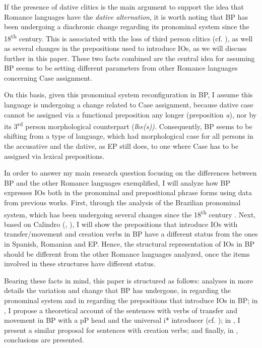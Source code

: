 \documentclass[output=paper,colorlinks,citecolor=brown,nonflat]{./langscibook}
\begin{document}
If the presence of dative clitics is the main argument to support the idea that Romance languages have the \textit{dative alternation}, it is worth noting that BP has been undergoing a diachronic change regarding its pronominal system since the 18\textsuperscript{th} century. This is associated with the loss of third person clitics (cf. \citealt{CarvalhoCalindro2018}), as well as several changes in the prepositions used to introduce IOs, as we will discuss further in this paper. These two facts combined are the central idea for assuming BP seems to be setting different parameters from other Romance languages concerning Case assignment.

On this basis, given this pronominal system reconfiguration in BP, I assume this language is undergoing a change related to Case assignment, because dative case cannot be assigned via a functional preposition any longer (preposition \textit{a}), nor by its 3\textsuperscript{rd} person morphological counterpart (\textit{lhe(s)).} Consequently, BP seems to be shifting from a type of language, which had morphological case for all persons in the accusative and the dative, as EP still does, to one where Case has to be assigned via lexical prepositions.

In order to answer my main research question focusing on the differences between BP and the other Romance languages exemplified, I will analyze how BP expresses IOs both in the pronominal and prepositional phrase forms using data from previous works. First, through the analysis of the Brazilian pronominal system, which has been undergoing several changes since the 18\textsuperscript{th} century \citep{KatoCyrinoCorrêa2009}. Next, based on Calindro (\citeyear{Calindro2015}, \citeyear{Calindro2016}), I will show the prepositions that introduce IOs with transfer/movement and creation verbs in BP have a different status from the ones in Spanish, Romanian and EP. Hence, the structural representation of IOs in BP should be different from the other Romance languages analyzed, once the items involved in these structures have different status.

Bearing these facts in mind, this paper is structured as follows:  analyses in more details the variation and change that BP has undergone, in  regarding the pronominal system and in  regarding the prepositions that introduce IOs in BP; in , I propose a theoretical account of the sentences with verbs of transfer and movement in BP with a pP head and the universal i* introducer (cf. \citealt{Wood2012, WoodMarantz2017}); in , I present a similar proposal for sentences with creation verbs; and finally, in , conclusions are presented.
\end{document}
